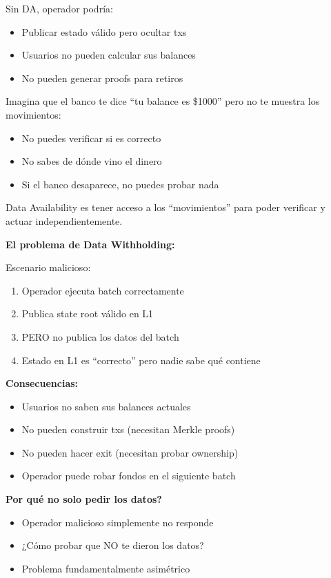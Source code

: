 \documentclass[11pt,a4paper,twoside,openright]{book}
\theoremstyle{definition}
\theoremstyle{plain}
\theoremstyle{remark}
\begin{document}
Sin DA, operador podría:
\begin{itemize}
    \item Publicar estado válido pero ocultar txs
    \item Usuarios no pueden calcular sus balances
    \item No pueden generar proofs para retiros
\end{itemize}

\begin{intuicion}
Imagina que el banco te dice ``tu balance es \$1000'' pero no te muestra los movimientos:
\begin{itemize}
    \item No puedes verificar si es correcto
    \item No sabes de dónde vino el dinero
    \item Si el banco desaparece, no puedes probar nada
\end{itemize}

Data Availability es tener acceso a los ``movimientos'' para poder verificar y actuar independientemente.
\end{intuicion}

\begin{mathnote}
\textbf{El problema de Data Withholding:}

Escenario malicioso:
\begin{enumerate}
    \item Operador ejecuta batch correctamente
    \item Publica state root válido en L1
    \item PERO no publica los datos del batch
    \item Estado en L1 es ``correcto'' pero nadie sabe qué contiene
\end{enumerate}

\textbf{Consecuencias:}
\begin{itemize}
    \item Usuarios no saben sus balances actuales
    \item No pueden construir txs (necesitan Merkle proofs)
    \item No pueden hacer exit (necesitan probar ownership)
    \item Operador puede robar fondos en el siguiente batch
\end{itemize}

\textbf{Por qué no solo pedir los datos?}
\begin{itemize}
    \item Operador malicioso simplemente no responde
    \item ¿Cómo probar que NO te dieron los datos?
    \item Problema fundamentalmente asimétrico
\end{itemize}
\end{mathnote}
\end{document}
